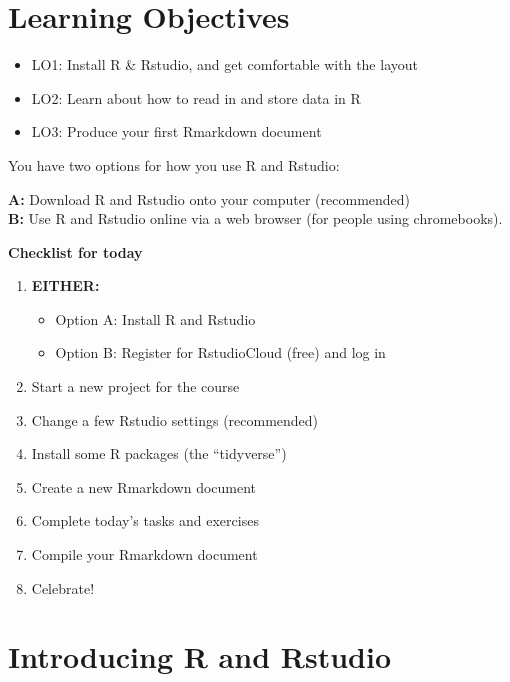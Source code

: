\documentclass[]{book}
\providecommand{\tightlist}{%
  \setlength{\itemsep}{0pt}\setlength{\parskip}{0pt}}
\begin{document}
\hypertarget{learning-objectives}{%
\section*{Learning Objectives}\label{learning-objectives}}

\begin{itemize}
\tightlist
\item
  LO1: Install R \& Rstudio, and get comfortable with the layout\\
\item
  LO2: Learn about how to read in and store data in R
\item
  LO3: Produce your first Rmarkdown document\\
\end{itemize}

You have two options for how you use R and Rstudio:

\textbf{A:} Download R and Rstudio onto your computer (recommended)\\
\textbf{B:} Use R and Rstudio online via a web browser (for people using chromebooks).

\textbf{Checklist for today}

\begin{enumerate}
\def\labelenumi{\arabic{enumi}.}
\tightlist
\item
  \textbf{EITHER:}

  \begin{itemize}
  \tightlist
  \item
    Option A: Install R and Rstudio
  \item
    Option B: Register for RstudioCloud (free) and log in
  \end{itemize}
\item
  Start a new project for the course
\item
  Change a few Rstudio settings (recommended)
\item
  Install some R packages (the ``tidyverse'')
\item
  Create a new Rmarkdown document
\item
  Complete today's tasks and exercises
\item
  Compile your Rmarkdown document
\item
  Celebrate!
\end{enumerate}

\hypertarget{introducing-r-and-rstudio}{%
\section{Introducing R and Rstudio}\label{introducing-r-and-rstudio}}
\end{document}
